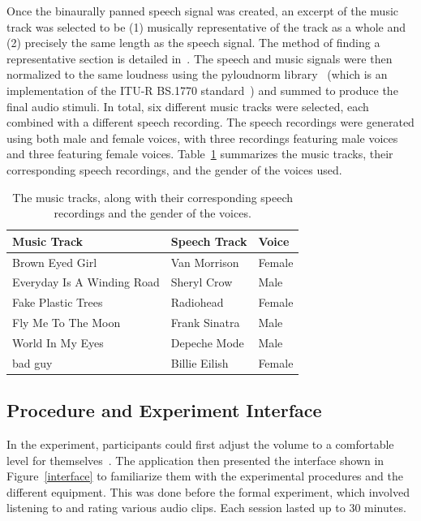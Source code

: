 \documentclass[a4paper,10pt]{edpsci} %
\begin{document}
Once the binaurally panned speech signal was created, an excerpt of the music track was selected to be (1) musically representative of the track as a whole and (2) precisely the same length as the speech signal. The method of finding a representative section is detailed in~\cite{jehan_extracting_2018}. The speech and music signals were then normalized to the same loudness using the pyloudnorm library~\cite{steinmetz_pyloudnorm_2021} (which is an implementation of the ITU-R BS.1770 standard~\cite{itu-r-bs-1770_lufs}) and summed to produce the final audio stimuli. In total, six different music tracks were selected, each combined with a different speech recording. The speech recordings were generated using both male and female voices, with three recordings featuring male voices and three featuring female voices. Table~\ref{musicspeech} summarizes the music tracks, their corresponding speech recordings, and the gender of the voices used.
\renewcommand{\arraystretch}{1.2}
\begin{table}[htb]
\centering
\setlength\tabcolsep{5pt}
\begin{tabular}{lll}
\toprule
 \textbf{Music Track} & \textbf{Speech Track} & \textbf{Voice}\\        
\midrule
 Brown Eyed Girl & Van Morrison & Female\\
 Everyday Is A Winding Road & Sheryl Crow & Male\\
 Fake Plastic Trees & Radiohead & Female\\
 Fly Me To The Moon & Frank Sinatra & Male\\
 World In My Eyes & Depeche Mode & Male\\
 bad guy & Billie Eilish & Female\\
\bottomrule
\end{tabular}
\caption{The music tracks, along with their corresponding speech recordings and the gender of the voices.}
\label{musicspeech}
\end{table}


\subsection{Procedure and Experiment Interface}
In the experiment, participants could first adjust the volume to a comfortable level for themselves~\cite{itu-r-bs-1534_MUSHRA}. The application then presented the interface shown in Figure~\ref{interface} to familiarize them with the experimental procedures and the different equipment. This was done before the formal experiment, which involved listening to and rating various audio clips. Each session lasted up to 30 minutes.
\end{document}
